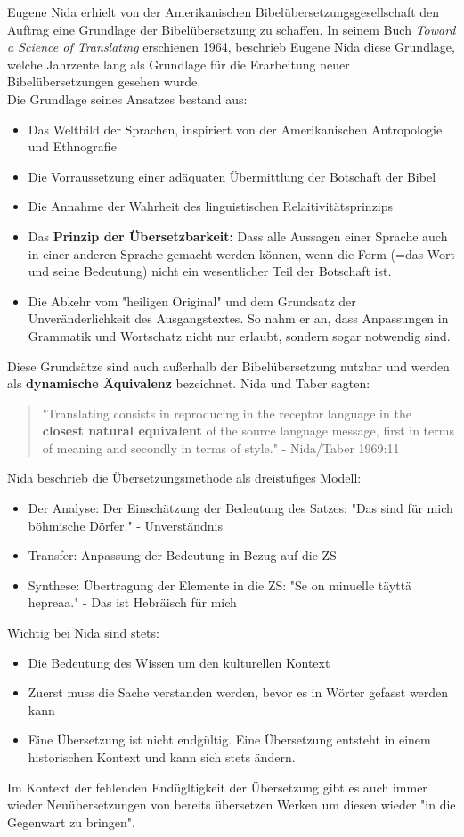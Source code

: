 \documentclass{article}
\begin{document}
	Eugene Nida erhielt von der Amerikanischen Bibelübersetzungsgesellschaft den Auftrag eine Grundlage der Bibelübersetzung zu schaffen. In seinem Buch \textit{Toward a Science of Translating} erschienen 1964, beschrieb Eugene Nida diese Grundlage, welche Jahrzente lang als Grundlage für die Erarbeitung neuer Bibelübersetzungen gesehen wurde. \\
	Die Grundlage seines Ansatzes bestand aus:
	\begin{itemize}
		\item{Das Weltbild der Sprachen, inspiriert von der Amerikanischen Antropologie und Ethnografie}
		\item{Die Vorraussetzung einer adäquaten Übermittlung der Botschaft der Bibel}
		\item{Die Annahme der Wahrheit des linguistischen Relaitivitätsprinzips}
		\item{Das \textbf{Prinzip der Übersetzbarkeit:} Dass alle Aussagen einer Sprache auch in einer anderen Sprache gemacht werden können, wenn die Form (=das Wort und seine Bedeutung) nicht ein wesentlicher Teil der Botschaft ist.}
		\item{Die Abkehr vom "heiligen Original" und dem Grundsatz der Unveränderlichkeit des Ausgangstextes. So nahm er an, dass Anpassungen in Grammatik und Wortschatz nicht nur erlaubt, sondern sogar notwendig sind.}
	\end{itemize}

	Diese Grundsätze sind auch außerhalb der Bibelübersetzung nutzbar und werden als \textbf{dynamische Äquivalenz} bezeichnet. Nida und Taber sagten:
	\begin{quote}
	"Translating consists in reproducing in the receptor language in the \textbf{closest natural equivalent} of the source language message, first in terms of meaning and secondly in terms of style." - Nida/Taber 1969:11
	\end{quote}
	Nida beschrieb die Übersetzungsmethode als dreistufiges Modell:
	\begin{itemize}
		\item{Der Analyse: Der Einschätzung der Bedeutung des Satzes: "Das sind für mich böhmische Dörfer." - Unverständnis}
		\item{Transfer: Anpassung der Bedeutung in Bezug auf die ZS}
		\item{Synthese: Übertragung der Elemente in die ZS: "Se on minuelle täyttä hepreaa." - Das ist Hebräisch für mich}
	\end{itemize}

	Wichtig bei Nida sind stets:
	\begin{itemize}
		\item{Die Bedeutung des Wissen um den kulturellen Kontext}
		\item{Zuerst muss die Sache verstanden werden, bevor es in Wörter gefasst werden kann}
		\item{Eine Übersetzung ist nicht endgültig. Eine Übersetzung entsteht in einem historischen Kontext und kann sich stets ändern.}
	\end{itemize}
	Im Kontext der fehlenden Endügltigkeit der Übersetzung gibt es auch immer wieder Neuübersetzungen von bereits übersetzen Werken um diesen wieder "in die Gegenwart zu bringen".
\end{document}
